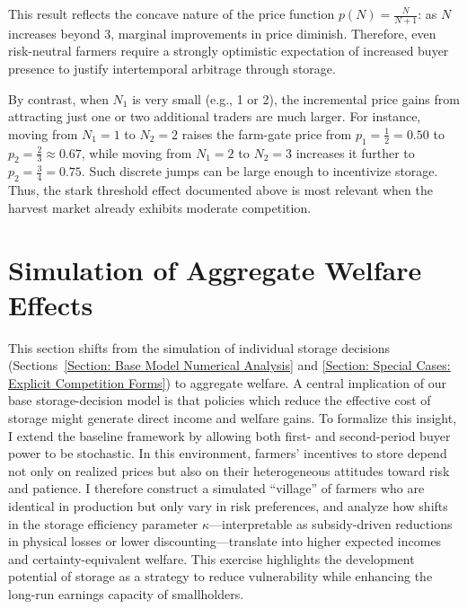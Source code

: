 This result reflects the concave nature of the price function $p(N) = \tfrac{N}{N+1}$: as $N$ increases beyond 3, marginal improvements in price diminish. Therefore, even risk-neutral farmers require a strongly optimistic expectation of increased buyer presence to justify intertemporal arbitrage through storage. 

By contrast, when $N_1$ is very small (e.g., 1 or 2), the incremental price gains from attracting just one or two additional traders are much larger. For instance, moving from $N_1=1$ to $N_2=2$ raises the farm-gate price from $p_1=\tfrac{1}{2}=0.50$ to $p_2=\tfrac{2}{3}\approx 0.67$, while moving from $N_1=2$ to $N_2=3$ increases it further to $p_2=\tfrac{3}{4}=0.75$. Such discrete jumps can be large enough to incentivize storage. Thus, the stark threshold effect documented above is most relevant when the harvest market already exhibits moderate competition.







\section{Simulation of Aggregate Welfare Effects}\label{subsec:agg_welfare}
\noindent
This section shifts from the simulation of individual storage decisions (Sections~\ref{Section: Base Model Numerical Analysis} and \ref{Section: Special Cases: Explicit Competition Forms}) to aggregate welfare. A central implication of our base storage-decision model is that policies which reduce the effective cost of storage might generate direct income and welfare gains. To formalize this insight, I extend the baseline framework by allowing both first- and second-period buyer power to be stochastic. In this environment, farmers’ incentives to store depend not only on realized prices but also on their heterogeneous attitudes toward risk and patience. I therefore construct a simulated “village” of farmers who are identical in production but only vary in risk preferences, and analyze how shifts in the storage efficiency parameter $\kappa$---interpretable as subsidy-driven reductions in physical losses or lower discounting---translate into higher expected incomes and certainty-equivalent welfare. This exercise highlights the development potential of storage as a strategy to reduce vulnerability while enhancing the long-run earnings capacity of smallholders.



